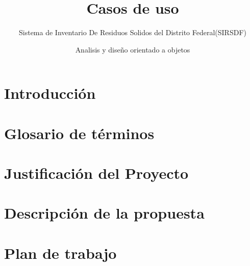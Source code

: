 \documentclass[10pt]{book}
\title{Casos de uso }
\subtitle{ Sistema de Inventario De Residuos Solidos del Distrito Federal(SIRSDF) }
\author{Analisis y diseño orientado a objetos}
\begin{document}
\maketitle
\thispagestyle{empty}

\frontmatter

\tableofcontents

\mainmatter
\chapter{Introducción}


\chapter{Glosario de términos}


\chapter{Justificación del Proyecto}


\chapter{Descripción de la propuesta}


\chapter{Plan de trabajo}


\end{document}
